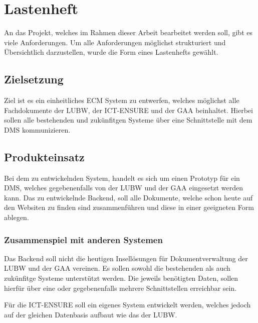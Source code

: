 \section{Lastenheft} \label{Lastenheft}
An das Projekt, welches im Rahmen dieser Arbeit bearbeitet werden soll, gibt es viele Anforderungen. Um alle Anforderungen m\"oglichst strukturiert und \"Ubersichtlich darzustellen, wurde die Form eines Lastenhefts gew\"ahlt.

\subsection{Zielsetzung} \label{Zielsetzung}
Ziel ist es ein einheitliches \ac{ECM} System zu entwerfen, welches m\"oglichst alle Fachdokumente der \ac{LUBW}, der \ac{ICT-ENSURE} und der \ac{GAA} beinhaltet.
Hierbei sollen alle bestehenden und zuk\"unfitgen Systeme \"uber eine Schnittstelle mit dem \ac{DMS} kommunizieren.

\subsection{Produkteinsatz} \label{Produkteinsatz}
Bei dem zu entwickelnden System, handelt es sich um einen Prototyp f\"ur ein \ac{DMS}, welches gegebenenfalls von der \ac{LUBW} und der \ac{GAA} eingesetzt werden kann. Das zu entwickelnde Backend, soll alle Dokumente, welche schon heute auf den Websiten zu finden sind zusammenf\"uhren und diese in einer geeigneten Form ablegen.

\subsubsection{Zusammenspiel mit anderen Systemen} \label{Zusammenspiel mit anderen Systemen}
Das Backend soll nicht die heutigen Insell\"osungen f\"ur Dokumentverwaltung der \ac{LUBW} und der \ac{GAA} vereinen. Es sollen sowohl die bestehenden als auch zuk\"unfitge Systeme unterst\"utzt werden. Die jeweils ben\"otigten Daten, sollen hierf\"ur \"uber eine oder gegebenenfalls mehrere Schnittstellen erreichbar sein.

F\"ur die \ac{ICT-ENSURE} soll ein eigenes System entwickelt werden, welches jedoch auf der gleichen Datenbasis aufbaut wie das der \ac{LUBW}.

